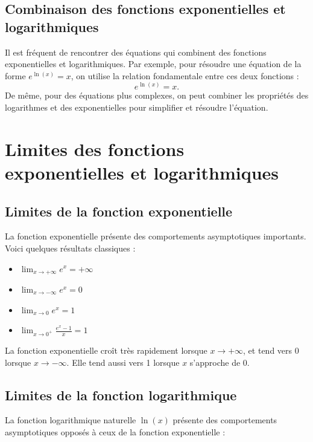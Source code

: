 \documentclass{article}
\begin{document}
	\subsection{Combinaison des fonctions exponentielles et logarithmiques}
	
	Il est fréquent de rencontrer des équations qui combinent des fonctions exponentielles et logarithmiques. Par exemple, pour résoudre une équation de la forme \( e^{\ln(x)} = x \), on utilise la relation fondamentale entre ces deux fonctions :
	\[
	e^{\ln(x)} = x.
	\]
	De même, pour des équations plus complexes, on peut combiner les propriétés des logarithmes et des exponentielles pour simplifier et résoudre l'équation.
	
	\section{Limites des fonctions exponentielles et logarithmiques}
	
	\subsection{Limites de la fonction exponentielle}
	
	La fonction exponentielle présente des comportements asymptotiques importants. Voici quelques résultats classiques :
	
\begin{itemize}
	\item \(\displaystyle \lim_{x \to +\infty} e^x = +\infty \)
	\item \(\displaystyle \lim_{x \to -\infty} e^x = 0 \)
	\item \(\displaystyle \lim_{x \to 0} e^x = 1 \)
	\item \(\displaystyle \lim_{x \to 0^+} \frac{ e^x - 1}{x} = 1 \)
\end{itemize}

	
	La fonction exponentielle croît très rapidement lorsque \( x \to +\infty \), et tend vers 0 lorsque \( x \to -\infty \). Elle tend aussi vers 1 lorsque \( x \) s'approche de 0.
	
	\subsection{Limites de la fonction logarithmique}
	
	La fonction logarithmique naturelle \( \ln(x) \) présente des comportements asymptotiques opposés à ceux de la fonction exponentielle :
	
\end{document}
